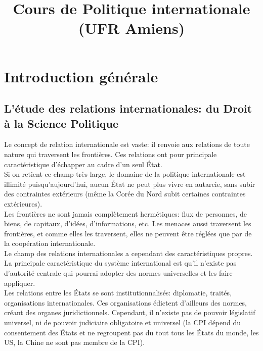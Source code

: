 \documentclass[10pt, a4paper, openany]{book}
\title{Cours de Politique internationale (UFR Amiens)}
\begin{document}
\maketitle
\tableofcontents

\chapter{Introduction générale}

\section{L'étude des relations internationales: du Droit à la Science Politique}

Le concept de relation internationale est vaste: il renvoie aux relations de toute nature qui traversent les frontières. Ces relations ont pour principale caractéristique d'échapper au cadre d'un seul État. \\
Si on retient ce champ très large, le domaine de la politique internationale est illimité puisqu'aujourd'hui, aucun État ne peut plus vivre en autarcie, sans subir des contraintes extérieurs (même la Corée du Nord subit certaines contraintes extérieures). \\
Les frontières ne sont jamais complètement hermétiques: flux de personnes, de biens, de capitaux, d'idées, d'informations, etc. Les menaces aussi traversent les frontières, et comme elles les traversent, elles ne peuvent être réglées que par de la coopération internationale. \\
Le champ des relations internationales a cependant des caractéristiques propres. La principale caractéristique du système international est qu'il n'existe pas d'autorité centrale qui pourrai adopter des normes universelles et les faire appliquer. \\
Les relations entre les États se sont institutionnalisés: diplomatie, traités, organisations internationales. Ces organisations édictent d'ailleurs des normes, créant des organes juridictionnels. Cependant, il n'existe pas de pouvoir législatif universel, ni de pouvoir judiciaire obligatoire et universel (la CPI dépend du consentement des États et ne regroupent pas du tout tous les États du monde, les US, la Chine ne sont pas membre de la CPI).
\end{document}
